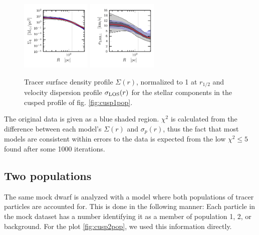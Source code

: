 \begin{figure}
    \begin{center}
        \hspace{-7mm}
        \includegraphics[width=0.3\textwidth]{fig/prof_1_pop_cusp/prof_Sig_1.pdf}
        \includegraphics[width=0.3\textwidth]{fig/prof_1_pop_cusp/prof_sig_1.pdf}
        \caption{\label{fig:Sigsiglos1pop} Tracer surface density profile
          $\Sigma(r)$, normalized to 1 at $r_{1/2}$ and velocity
          dispersion profile $\sigma_{\text{LOS}}(r)$ for the stellar components
          in the cusped profile of fig. \ref{fig:cusp1pop}.}
    \end{center}
\end{figure}

The original data is given as a blue shaded region. $\chi^2$ is
calculated from the difference between each model's $\Sigma(r)$ and
$\sigma_p(r)$, thus the fact that most models are consistent within
errors to the data is expected from the low $\chi^2 \leq5$ found after
some 1000 iterations.



\subsection{Two populations}
The same mock dwarf is analyzed with a model where both populations of
tracer particles are accounted for. This is done in the following
manner: Each particle in the mock dataset has a number identifying it
as a member of population 1, 2, or background. For the plot
\ref{fig:cusp2pop}, we used this information directly.

